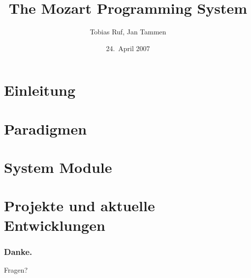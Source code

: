 \documentclass{beamer}
\title[WBSY SS07]{The Mozart Programming System}
\author[Ruf, Tammen]{Tobias Ruf, Jan Tammen}
\institute{
  Wissensbasierte Systeme SS 07,\\
  Fakultät Informatik,\\
  HTWG Konstanz
}
\date{24.~April 2007}
\begin{document}
\begin{frame}
  \centering{}
  \titlepage
\end{frame}

\begin{frame}[label=toc]
  \tableofcontents
\end{frame} 

\section{Einleitung}


\section{Paradigmen}

 
\section{System Module}
 

\section{Projekte und aktuelle Entwicklungen}


\begin{frame}
  \frametitle{Danke.}
  Fragen?
\end{frame}
\end{document}
